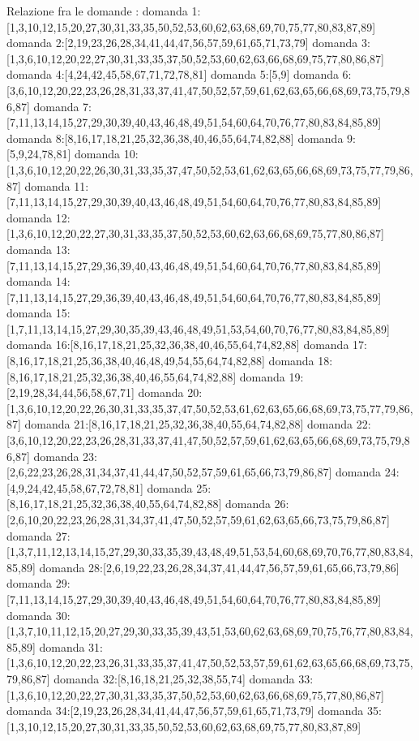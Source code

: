 Relazione fra le domande :
domanda 1:[1,3,10,12,15,20,27,30,31,33,35,50,52,53,60,62,63,68,69,70,75,77,80,83,87,89]
domanda 2:[2,19,23,26,28,34,41,44,47,56,57,59,61,65,71,73,79]
domanda 3:[1,3,6,10,12,20,22,27,30,31,33,35,37,50,52,53,60,62,63,66,68,69,75,77,80,86,87]
domanda 4:[4,24,42,45,58,67,71,72,78,81]
domanda 5:[5,9]
domanda 6:[3,6,10,12,20,22,23,26,28,31,33,37,41,47,50,52,57,59,61,62,63,65,66,68,69,73,75,79,86,87]
domanda 7:[7,11,13,14,15,27,29,30,39,40,43,46,48,49,51,54,60,64,70,76,77,80,83,84,85,89]
domanda 8:[8,16,17,18,21,25,32,36,38,40,46,55,64,74,82,88]
domanda 9:[5,9,24,78,81]
domanda 10:[1,3,6,10,12,20,22,26,30,31,33,35,37,47,50,52,53,61,62,63,65,66,68,69,73,75,77,79,86,87]
domanda 11:[7,11,13,14,15,27,29,30,39,40,43,46,48,49,51,54,60,64,70,76,77,80,83,84,85,89]
domanda 12:[1,3,6,10,12,20,22,27,30,31,33,35,37,50,52,53,60,62,63,66,68,69,75,77,80,86,87]
domanda 13:[7,11,13,14,15,27,29,36,39,40,43,46,48,49,51,54,60,64,70,76,77,80,83,84,85,89]
domanda 14:[7,11,13,14,15,27,29,36,39,40,43,46,48,49,51,54,60,64,70,76,77,80,83,84,85,89]
domanda 15:[1,7,11,13,14,15,27,29,30,35,39,43,46,48,49,51,53,54,60,70,76,77,80,83,84,85,89]
domanda 16:[8,16,17,18,21,25,32,36,38,40,46,55,64,74,82,88]
domanda 17:[8,16,17,18,21,25,36,38,40,46,48,49,54,55,64,74,82,88]
domanda 18:[8,16,17,18,21,25,32,36,38,40,46,55,64,74,82,88]
domanda 19:[2,19,28,34,44,56,58,67,71]
domanda 20:[1,3,6,10,12,20,22,26,30,31,33,35,37,47,50,52,53,61,62,63,65,66,68,69,73,75,77,79,86,87]
domanda 21:[8,16,17,18,21,25,32,36,38,40,55,64,74,82,88]
domanda 22:[3,6,10,12,20,22,23,26,28,31,33,37,41,47,50,52,57,59,61,62,63,65,66,68,69,73,75,79,86,87]
domanda 23:[2,6,22,23,26,28,31,34,37,41,44,47,50,52,57,59,61,65,66,73,79,86,87]
domanda 24:[4,9,24,42,45,58,67,72,78,81]
domanda 25:[8,16,17,18,21,25,32,36,38,40,55,64,74,82,88]
domanda 26:[2,6,10,20,22,23,26,28,31,34,37,41,47,50,52,57,59,61,62,63,65,66,73,75,79,86,87]
domanda 27:[1,3,7,11,12,13,14,15,27,29,30,33,35,39,43,48,49,51,53,54,60,68,69,70,76,77,80,83,84,85,89]
domanda 28:[2,6,19,22,23,26,28,34,37,41,44,47,56,57,59,61,65,66,73,79,86]
domanda 29:[7,11,13,14,15,27,29,30,39,40,43,46,48,49,51,54,60,64,70,76,77,80,83,84,85,89]
domanda 30:[1,3,7,10,11,12,15,20,27,29,30,33,35,39,43,51,53,60,62,63,68,69,70,75,76,77,80,83,84,85,89]
domanda 31:[1,3,6,10,12,20,22,23,26,31,33,35,37,41,47,50,52,53,57,59,61,62,63,65,66,68,69,73,75,79,86,87]
domanda 32:[8,16,18,21,25,32,38,55,74]
domanda 33:[1,3,6,10,12,20,22,27,30,31,33,35,37,50,52,53,60,62,63,66,68,69,75,77,80,86,87]
domanda 34:[2,19,23,26,28,34,41,44,47,56,57,59,61,65,71,73,79]
domanda 35:[1,3,10,12,15,20,27,30,31,33,35,50,52,53,60,62,63,68,69,75,77,80,83,87,89]
